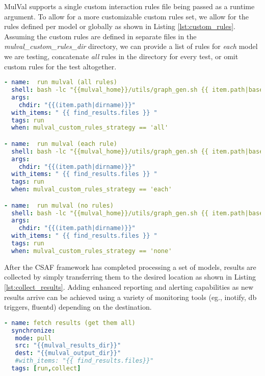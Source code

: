 MulVal supports a single custom interaction rules file being passed as a runtime argument. To allow for a more customizable custom rules set, we allow for the rules defined per model or globally as shown in Listing \ref{lst:custom_rules}. Assuming the custom rules are defined in separate files in the \textit{mulval\_custom\_rules\_dir} directory, we can provide a list of rules for \textit{each} model we are testing, concatenate \textit{all} rules in the directory for every test, or omit custom rules for the test altogether.

\begin{lstlisting}[language=yaml, label={lst:custom_rules}, caption={MulVal custom rule strategies},captionpos=b, linewidth=.9\textwidth]
- name:  run mulval (all rules)
  shell: bash -lc "{{mulval_home}}/utils/graph_gen.sh {{ item.path|basename }} -p -v -a {{mulval_custom_rules_dir}}/custom_rules.P "
  args:
    chdir: "{{(item.path|dirname)}}"
  with_items: " {{ find_results.files }} "
  tags: run
  when: mulval_custom_rules_strategy == 'all'

- name:  run mulval (each rule)
  shell: bash -lc "{{mulval_home}}/utils/graph_gen.sh {{ item.path|basename }} -p -v -a {{mulval_custom_rules_dir}}/{{ item.path|basename }}.rules  "
  args:
    chdir: "{{(item.path|dirname)}}"
  with_items: " {{ find_results.files }} "
  tags: run
  when: mulval_custom_rules_strategy == 'each'

- name:  run mulval (no rules)
  shell: bash -lc "{{mulval_home}}/utils/graph_gen.sh {{ item.path|basename }} -p -v"
  args:
    chdir: "{{(item.path|dirname)}}"
  with_items: " {{ find_results.files }} "
  tags: run
  when: mulval_custom_rules_strategy == 'none'

\end{lstlisting}

After the CSAF framework has completed processing a set of models, results are collected by simply transferring them to the desired location as shown in Listing \ref{lst:collect_results}. Adding enhanced reporting and alerting capabilities as new results arrive can be achieved using a variety of monitoring tools (eg., inotify, db triggers, fluentd) depending on the destination.

\begin{lstlisting}[language=yaml, label={lst:collect_results}, caption={Collect Results},captionpos=b, linewidth=.9\textwidth,]
- name: fetch results (get them all)
  synchronize:
   mode: pull
   src: "{{mulval_results_dir}}"
   dest: "{{mulval_output_dir}}"
   #with_items: "{{ find_results.files}}"
  tags: [run,collect]
\end{lstlisting}
